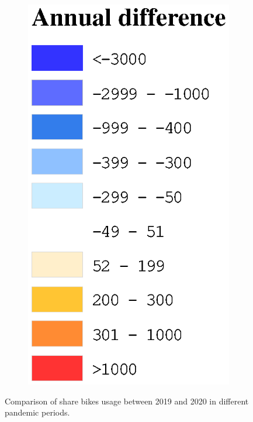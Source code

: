 \documentclass[preprints,ijgi,submit,moreauthors]{Definitions/mdpi}
\begin{document}
\begin{figure}[ht]
\begin{subfigure}{.14\textwidth}
        \includegraphics[width=\textwidth]{Figures/AnnualDifLegend.eps}
    \end{subfigure}
    \caption{Comparison of share bikes usage between 2019 and 2020 in different pandemic periods.}
    \label{fig:compare_2019_and_2020}
\end{figure}
\end{document}
